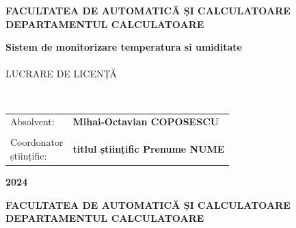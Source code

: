 \pagestyle{fancy}
\setlength{\voffset}{-10pt}
\setlength\headheight{70.0pt}
\renewcommand{\headrulewidth}{0pt}
\cfoot{}
\lfoot{}
\rfoot{}
\renewcommand{\thesisauthor}{Mihai-Octavian COPOSESCU}    %
\renewcommand{\thesismonth}{Iulie}     %
\renewcommand{\thesisyear}{2024}      %
\renewcommand{\thesistitle}{Sistem de monitorizare temperatura si umiditate} %
\renewcommand{\thesissupervisor}{titlul științific Prenume NUME} %
\newcommand{\makeThesisTitle}{\textbf{\thesistitletypesize \thesistitle}}
\newcommand{\makeThesisType}{\thesistypetypesize \thesistype}
\newcommand{\department}{\sffamily\bfseries\small FACULTATEA DE AUTOMATICĂ ȘI CALCULATOARE\\
	DEPARTAMENTUL CALCULATOARE} 
\renewcommand{\thesistype}{LUCRARE DE LICENȚĂ}
\newcommand{\uline}[1]{\rule[0pt]{#1}{0.4pt}}
\begin{center}
	{\department}
	
	\vspace{4cm}
	\makeThesisTitle
	~\\~\\
	
	\makeThesisType
	
	~\\\vspace{6.5cm}
	
	\begin{tabular}{p{.3\linewidth}p{.5\linewidth}}
		{\hfill Absolvent:} & {\bf \thesisauthor} \\
		&\\
		{\parbox[t]{\linewidth}{\qquad\qquad\qquad Coordonator\\\hspace*{3.2cm}științific:}}& {\bf \thesissupervisor}\\
	\end{tabular}
	
	\vspace{3cm}
	{\bf \thesisyear}
\end{center}
\newpage
\begin{center}
	{\department}
\end{center}
\vspace{0.5cm}

